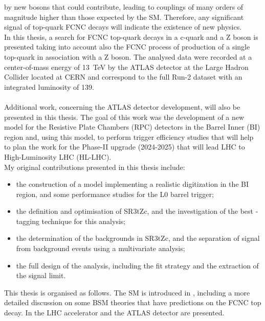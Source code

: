 by new bosons that could contribute, leading to couplings of many orders of magnitude higher
than those expected by the SM.
Therefore, any significant signal of top-quark FCNC decays will indicate the existence of new physics.
\vspace{\baselineskip}
\\In this thesis, a search for FCNC top-quark decays in a c-quark and a Z boson is presented taking into 
account also the FCNC process of production of a single top-quark in association with a Z boson.
The analysed data were recorded at a center-of-mass energy of \SI{13}{\TeV} by the ATLAS detector at 
the Large Hadron Collider located at CERN and correspond to the full Run-2 dataset 
with an integrated luminosity of \SI{139}{\ifb}.\\
\vspace{\baselineskip}
\\Additional work, concerning the ATLAS detector development, will also be presented in this thesis. 
The goal of this work was the development of a new model for the Resistive Plate Chambers (RPC) detectors in the Barrel Inner (BI) region and, using this model, to perform trigger efficiency studies that will help to plan the work for the Phase-II upgrade (2024-2025) that will lead LHC to High-Luminosity LHC (HL-LHC).
\vspace{\baselineskip}
\\My original contributions presented in this thesis include:
\begin{itemize}
	\item the construction of a model implementing a realistic digitization in the BI region, and some performance studies for the L0 barrel trigger;
	\item  the definition and optimisation of SR3tZc, and the investigation of the best \Pqc-tagging technique for this analysis;
	\item the determination of the backgrounds in SR3tZc, and the separation of signal from background events using a multivariate analysis;
	\item the full design of the analysis, including the fit strategy and the extraction of the signal limit. \\
\end{itemize}
\vspace{\baselineskip}
\noindent This thesis is organised as follows. The SM is introduced in  , including a
more detailed discussion on some BSM theories that have predictions on the FCNC top decay. 
In  the LHC accelerator and the ATLAS detector are presented. 
